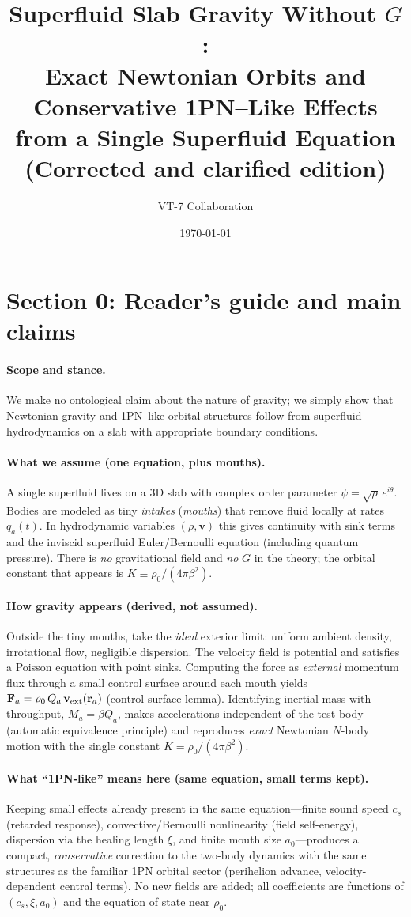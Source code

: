 \documentclass[11pt]{article}
\title{Superfluid Slab Gravity Without \texorpdfstring{$G$}{G}: \\
Exact Newtonian Orbits and Conservative 1PN--Like Effects from a Single Superfluid Equation \\[4pt]
\large (Corrected and clarified edition)}
\author{VT-7 Collaboration}
\date{\today}
\numberwithin{equation}{section}
\theoremstyle{plain}
\theoremstyle{remark}
\theoremstyle{definition}
\begin{document}
\maketitle

\section*{Section 0: Reader's guide and main claims}
\label{sec:claims}
\paragraph{Scope and stance.}
We make no ontological claim about the nature of gravity; we simply show that Newtonian gravity and 1PN--like orbital structures follow from superfluid hydrodynamics on a slab with appropriate boundary conditions.

\paragraph{What we assume (one equation, plus mouths).}
A single superfluid lives on a 3D slab with complex order parameter $\psi=\sqrt{\rho}\,e^{i\theta}$. Bodies are modeled as tiny \emph{intakes} (\emph{mouths}) that remove fluid locally at rates $q_a(t)$. In hydrodynamic variables $(\rho,\mathbf v)$ this gives continuity with sink terms and the inviscid superfluid Euler/Bernoulli equation (including quantum pressure). There is \emph{no} gravitational field and \emph{no} $G$ in the theory; the orbital constant that appears is $K\equiv \rho_0/(4\pi\beta^2)$.

\paragraph{How gravity appears (derived, not assumed).}
Outside the tiny mouths, take the \emph{ideal} exterior limit: uniform ambient density, irrotational flow, negligible dispersion. The velocity field is potential and satisfies a Poisson equation with point sinks. Computing the force as \emph{external} momentum flux through a small control surface around each mouth yields $\mathbf F_a=\rho_0\,Q_a\,\mathbf v_{\rm ext}(\mathbf r_a)$ (control-surface lemma). Identifying inertial mass with throughput, $M_a=\beta Q_a$, makes accelerations independent of the test body (automatic equivalence principle) and reproduces \emph{exact} Newtonian $N$-body motion with the single constant $K=\rho_0/(4\pi\beta^2)$.

\paragraph{What ``1PN-like'' means here (same equation, small terms kept).}
Keeping small effects already present in the same equation---finite sound speed $c_s$ (retarded response), convective/Bernoulli nonlinearity (field self-energy), dispersion via the healing length $\xi$, and finite mouth size $a_0$---produces a compact, \emph{conservative} correction to the two-body dynamics with the same structures as the familiar 1PN orbital sector (perihelion advance, velocity-dependent central terms). No new fields are added; all coefficients are functions of $(c_s,\xi,a_0)$ and the equation of state near $\rho_0$.
\end{document}
